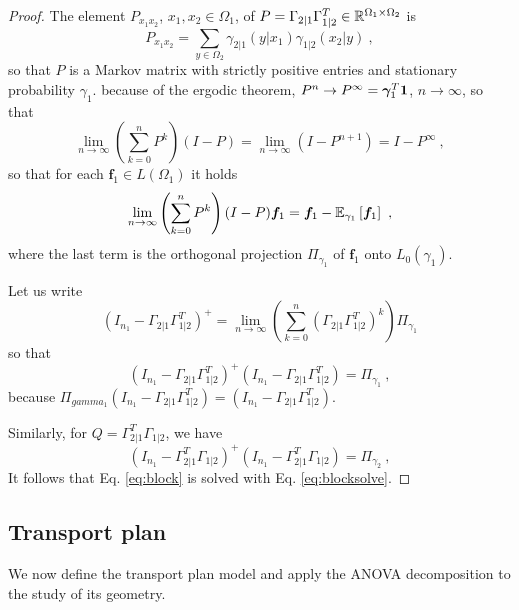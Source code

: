 \documentclass[runningheads]{llncs}
\begin{document}
\begin{proof}
The element $P_{x_1x_2}$, $x_1,x_2 \in \Omega_1$, of $P = \Gamma_{2|1}\Gamma_{1|2}^T \in \mathbb R^{\Omega_1 \times \Omega_2}$ is
%
\begin{equation*}
  P_{x_1x_2} = \sum_{y \in \Omega_2} \gamma_{2|1}(y|x_1) \gamma_{1|2}(x_2|y) \ ,
\end{equation*}
%
so that $P$ is a Markov matrix with strictly positive entries and stationary probability $\gamma_1$. because of the ergodic theorem, $P^n \to P^\infty = {\bm \gamma}_1^T \bm 1$, $n \to \infty$, so that 
%
\begin{equation*}
\lim_{n\to\infty} \left(\sum_{k=0}^n P^k\right)(I-P) = \lim_{n\to\infty} \left(I - P^{n+1}\right) = I - P^\infty \ , 
\end{equation*}
%
so that for each $\bm f_1 \in L(\Omega_1)$ it holds
%
\begin{equation*}
  \lim_{n\to\infty} \left(\sum_{k=0}^n P^k\right)(I-P) \bm f_1 = \bm f_1 - {\operatorname{\mathbb E}}_{\gamma_1}\left[\bm f_1\right] \ ,
\end{equation*}
%
where the last term is the orthogonal projection $\Pi_{\gamma_1}$ of $\bm f_1$ onto $L_0(\gamma_1)$. 

Let us write
%
\begin{equation*}
  (I_{n_1}-\Gamma_{2|1}\Gamma_{1|2}^T)^{+} = \lim_{n\to\infty} \left(\sum_{k=0}^n (\Gamma_{2|1}\Gamma_{1|2}^T)^k\right) \Pi_{\gamma_1}  
\end{equation*}
%
so that
%
\begin{equation*}
  (I_{n_1}-\Gamma_{2|1}\Gamma_{1|2}^T)^{+}(I_{n_1}-\Gamma_{2|1}\Gamma_{1|2}^T) = \Pi_{\gamma_1} \ ,
\end{equation*}
%
because $\Pi_{gamma_1} (I_{n_1}-\Gamma_{2|1}\Gamma_{1|2}^T) = (I_{n_1}-\Gamma_{2|1}\Gamma_{1|2}^T)$.

Similarly, for $Q = \Gamma_{2|1}^T\Gamma_{1|2}$, we have
%
\begin{equation*}
  (I_{n_1}-\Gamma_{2|1}^T\Gamma_{1|2})^{+}(I_{n_1}-\Gamma_{2|1}^T\Gamma_{1|2}) = \Pi_{\gamma_2} \ ,
\end{equation*}
%
It follows that Eq. \eqref{eq:block} is solved with Eq. \eqref{eq:blocksolve}.
\end{proof}

\subsection{Transport plan}

We now define the transport plan model and apply the ANOVA decomposition to the study of its geometry. 
\end{document}
